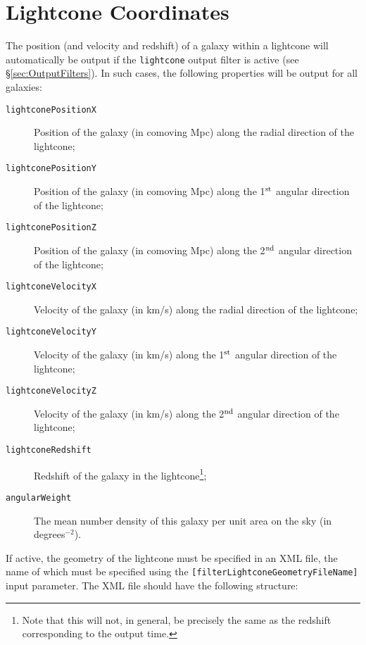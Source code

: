 \section{Lightcone Coordinates}\label{sec:OutputLightcone}

The position (and velocity and redshift) of a galaxy within a lightcone will automatically be output if the {\tt lightcone} output filter is active (see \S\ref{sec:OutputFilters}). In such cases, the following properties will be output for all galaxies:
\begin{description}
 \item [{\tt lightconePositionX}] Position of the galaxy (in comoving Mpc) along the radial direction of the lightcone;
 \item [{\tt lightconePositionY}] Position of the galaxy (in comoving Mpc) along the 1$^{\rm st}$ angular direction of the lightcone;
 \item [{\tt lightconePositionZ}] Position of the galaxy (in comoving Mpc) along the 2$^{\rm nd}$ angular direction of the lightcone;
 \item [{\tt lightconeVelocityX}] Velocity of the galaxy (in km/s) along the radial direction of the lightcone;
 \item [{\tt lightconeVelocityY}] Velocity of the galaxy (in km/s) along the 1$^{\rm st}$ angular direction of the lightcone;
 \item [{\tt lightconeVelocityZ}] Velocity of the galaxy (in km/s) along the 2$^{\rm nd}$ angular direction of the lightcone;
 \item [{\tt lightconeRedshift}] Redshift of the galaxy in the lightcone\footnote{Note that this will not, in general, be precisely the same as the redshift corresponding to the output time.};
 \item [{\tt angularWeight}] The mean number density of this galaxy per unit area on the sky (in degrees$^{-2}$).
\end{description}
If active, the geometry of the lightcone must be specified in an XML file, the name of which must be specified using the {\tt [filterLightconeGeometryFileName]} input parameter. The XML file should have the following structure:
